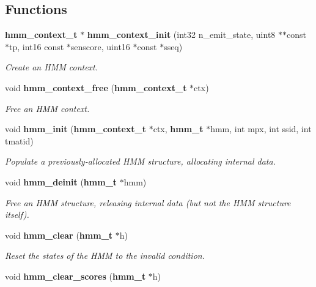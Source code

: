 \subsection*{Functions}
\begin{DoxyCompactItemize}
\item 
{\bf hmm\+\_\+context\+\_\+t} $\ast$ {\bf hmm\+\_\+context\+\_\+init} (int32 n\+\_\+emit\+\_\+state, uint8 $\ast$$\ast$const $\ast$tp, int16 const $\ast$senscore, uint16 $\ast$const $\ast$sseq)\label{hmm_8h_a4d6e2799cbe290112e8517adcab1b038}

\begin{DoxyCompactList}\small\item\em Create an H\+M\+M context. \end{DoxyCompactList}\item 
void {\bf hmm\+\_\+context\+\_\+free} ({\bf hmm\+\_\+context\+\_\+t} $\ast$ctx)
\begin{DoxyCompactList}\small\item\em Free an H\+M\+M context. \end{DoxyCompactList}\item 
void {\bf hmm\+\_\+init} ({\bf hmm\+\_\+context\+\_\+t} $\ast$ctx, {\bf hmm\+\_\+t} $\ast$hmm, int mpx, int ssid, int tmatid)\label{hmm_8h_aa911ae0d1c0eba562692fbeebca90d78}

\begin{DoxyCompactList}\small\item\em Populate a previously-\/allocated H\+M\+M structure, allocating internal data. \end{DoxyCompactList}\item 
void {\bf hmm\+\_\+deinit} ({\bf hmm\+\_\+t} $\ast$hmm)\label{hmm_8h_a7440ced1649225beb6816bf62481e08b}

\begin{DoxyCompactList}\small\item\em Free an H\+M\+M structure, releasing internal data (but not the H\+M\+M structure itself). \end{DoxyCompactList}\item 
void {\bf hmm\+\_\+clear} ({\bf hmm\+\_\+t} $\ast$h)
\begin{DoxyCompactList}\small\item\em Reset the states of the H\+M\+M to the invalid condition. \end{DoxyCompactList}\item 
void {\bf hmm\+\_\+clear\+\_\+scores} ({\bf hmm\+\_\+t} $\ast$h)\label{hmm_8h_a9561d7ffa1e61c99de2d2b900774152f}


\end{DoxyCompactItemize}
